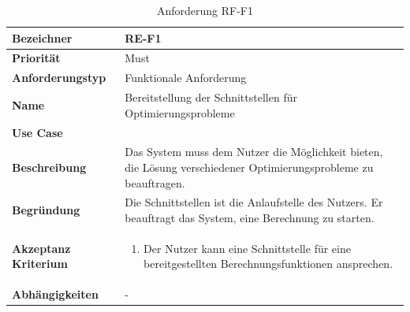 \begin{table}[ht]
\centering
  \begin{tabular}{ l | p{8cm} }
	\hline
	\rowcolor{gray}
	\textbf{Bezeichner}&	\textbf{RE-F1}\\ \hline
	\textbf{Priorität} 		&	Must\\ \hline
	\textbf{Anforderungstyp}	&	Funktionale Anforderung\\ \hline
	\textbf{Name} 			&	Bereitstellung der Schnittstellen für Optimierungsprobleme\\ \hline
	\textbf{Use Case} 		&	\nameref{table:use_case_1}\\ \hline
	\textbf{Beschreibung} 	&	Das System muss dem Nutzer die Möglichkeit bieten, die Lösung verschiedener Optimierungsprobleme zu beauftragen.\\ \hline
	\textbf{Begründung} 		&	Die Schnittstellen ist die Anlaufstelle des Nutzers. Er beauftragt das System, eine Berechnung zu starten.\\ \hline
	\textbf{Akzeptanz Kriterium}	&	\begin{enumerate}
					\item Der Nutzer kann eine Schnittstelle für eine bereitgestellten Berechnungsfunktionen ansprechen.
					\end{enumerate}
					\\ \hline
	\textbf{Abhängigkeiten} 	&	-\\ \hline
  \end{tabular}
   \caption{Anforderung RF-F1}\label{table:req_1}
\end{table}

